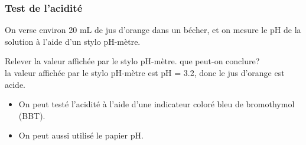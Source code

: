 \documentclass[12pt,a4paper]{book}
\begin{document}
{\subsubsection{Test de l'acidité}
On verse environ 20 mL de jus d'orange dans un bécher, et on mesure le pH de la solution à l'aide d'un stylo pH-mètre.\\
\begin{center}
\end{center}
Relever la valeur affichée par le stylo pH-mètre. que peut-on conclure?\\
la valeur affichée par le stylo pH-mètre est pH = 3.2, donc le jus d'orange est acide.
\begin{Box}[Remarque][titlegrammar]
\begin{itemize}
\item On peut testé l'acidité à l'aide d'une indicateur coloré bleu de bromothymol (BBT).
\begin{center}
\end{center}
\item On peut aussi utilisé le papier pH.
\begin{center}
\end{center}
\end{itemize}
\end{Box}
}
\end{document}
